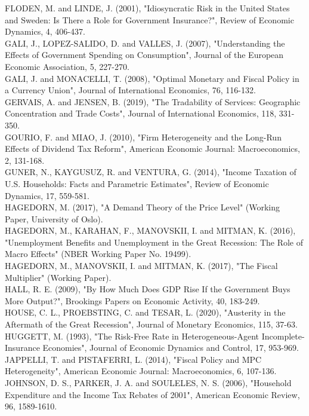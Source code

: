 \documentclass[10pt]{article}
\begin{document}
FLODEN, M. and LINDE, J. (2001), "Idiosyncratic Risk in the United States and Sweden: Is There a Role for Government Insurance?", Review of Economic Dynamics, 4, 406-437.\\
GALI, J., LOPEZ-SALIDO, D. and VALLES, J. (2007), "Understanding the Effects of Government Spending on Consumption", Journal of the European Economic Association, 5, 227-270.\\
GALI, J. and MONACELLI, T. (2008), "Optimal Monetary and Fiscal Policy in a Currency Union", Journal of International Economics, 76, 116-132.\\
GERVAIS, A. and JENSEN, B. (2019), "The Tradability of Services: Geographic Concentration and Trade Costs", Journal of International Economics, 118, 331-350.\\
GOURIO, F. and MIAO, J. (2010), "Firm Heterogeneity and the Long-Run Effects of Dividend Tax Reform", American Economic Journal: Macroeconomics, 2, 131-168.\\
GUNER, N., KAYGUSUZ, R. and VENTURA, G. (2014), "Income Taxation of U.S. Households: Facts and Parametric Estimates", Review of Economic Dynamics, 17, 559-581.\\
HAGEDORN, M. (2017), "A Demand Theory of the Price Level" (Working Paper, University of Oslo).\\
HAGEDORN, M., KARAHAN, F., MANOVSKII, I. and MITMAN, K. (2016), "Unemployment Benefits and Unemployment in the Great Recession: The Role of Macro Effects" (NBER Working Paper No. 19499).\\
HAGEDORN, M., MANOVSKII, I. and MITMAN, K. (2017), "The Fiscal Multiplier" (Working Paper).\\
HALL, R. E. (2009), "By How Much Does GDP Rise If the Government Buys More Output?", Brookings Papers on Economic Activity, 40, 183-249.\\
HOUSE, C. L., PROEBSTING, C. and TESAR, L. (2020), "Austerity in the Aftermath of the Great Recession", Journal of Monetary Economics, 115, 37-63.\\
HUGGETT, M. (1993), "The Risk-Free Rate in Heterogeneous-Agent Incomplete-Insurance Economies", Journal of Economic Dynamics and Control, 17, 953-969.\\
JAPPELLI, T. and PISTAFERRI, L. (2014), "Fiscal Policy and MPC Heterogeneity", American Economic Journal: Macroeconomics, 6, 107-136.\\
JOHNSON, D. S., PARKER, J. A. and SOULELES, N. S. (2006), "Household Expenditure and the Income Tax Rebates of 2001", American Economic Review, 96, 1589-1610.\\
\end{document}
